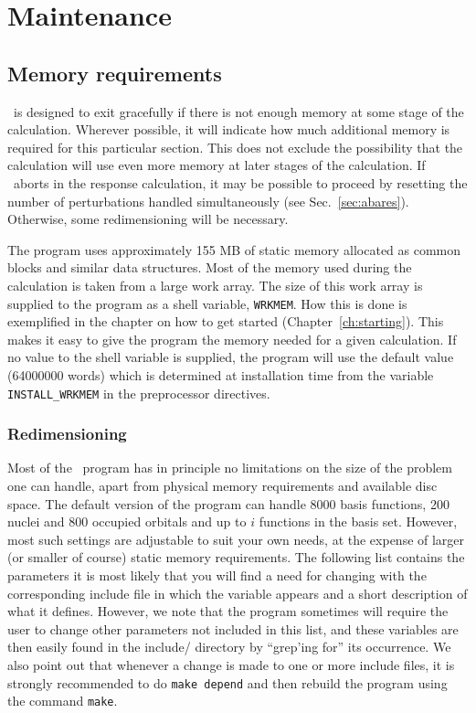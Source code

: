 \chapter{Maintenance}\label{ch:maintain}

\section{Memory requirements}

\dalton\ is designed to exit gracefully if there is not enough
memory at some stage of the calculation.  Wherever possible, it
will indicate how much additional memory is required for this
particular section.  This does not exclude the possibility that
the calculation will use even more memory at later stages of the
calculation. If \dalton\ aborts in the response calculation, it
may be possible to proceed by resetting the number of
perturbations handled simultaneously (see 
Sec.~\ref{sec:abares}).  Otherwise, some redimensioning will be
necessary.

The program uses approximately 155 MB of static memory allocated as common
blocks and similar data structures. Most of the memory used during the
calculation is taken from a large work array. The size of this work
array is supplied to the program as a shell
variable, \verb|WRKMEM|.
How this is done is exemplified in the chapter on how to get started
(Chapter~\ref{ch:starting}). This makes it easy
to give the program the memory needed for a given calculation. If no
value to the shell 
variable is supplied, the program will use the default value
(64000000 words) which is
determined at installation time from the variable
\verb|INSTALL_WRKMEM| in the preprocessor
directives.

\subsection{Redimensioning \dalton}

Most of the \dalton\ program has in principle no limitations on
the size of the problem one can handle, apart from
physical memory requirements and available disc space. The default
version of the program can handle 8000 basis functions, 200 nuclei and
800 occupied orbitals and up to $i$ functions in the basis
set. However, most such settings are adjustable to suit your own
needs, at the expense of larger (or smaller of course) static memory
requirements. The following list contains the parameters it is
most likely that you will find a need for changing with the
corresponding include 
file in which the variable appears and a short description of what
it defines. However, we note that the program sometimes will
require the user to change other parameters not included in this
list, and these variables are then easily found in the include/
directory by ``grep'ing for'' its occurrence. We also point out that
whenever a change is made to one or more include files, it is strongly
recommended to do \verb|make depend| and then rebuild the program using the
command \verb|make|.

